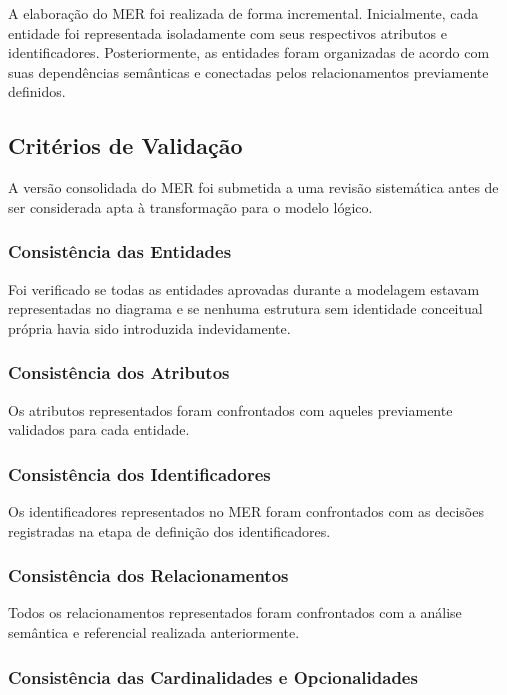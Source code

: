 \documentclass[12pt,a4paper]{article}
\begin{document}
	A elaboração do MER foi realizada de forma incremental. Inicialmente, cada
	entidade foi representada isoladamente com seus respectivos atributos e
	identificadores. Posteriormente, as entidades foram organizadas de acordo com
	suas dependências semânticas e conectadas pelos relacionamentos previamente
	definidos.
	
	\mbox{}\vspace{-\baselineskip}
	\subsection{Critérios de Validação}
	
	A versão consolidada do MER foi submetida a uma revisão sistemática antes de
	ser considerada apta à transformação para o modelo lógico.
	
	\subsubsection{Consistência das Entidades}
	
	Foi verificado se todas as entidades aprovadas durante a modelagem estavam
	representadas no diagrama e se nenhuma estrutura sem identidade conceitual
	própria havia sido introduzida indevidamente.
	
	\subsubsection{Consistência dos Atributos}
	
	Os atributos representados foram confrontados com aqueles previamente
	validados para cada entidade.
	
	\subsubsection{Consistência dos Identificadores}
	
	Os identificadores representados no MER foram confrontados com as decisões
	registradas na etapa de definição dos identificadores.
	
	\subsubsection{Consistência dos Relacionamentos}
	
	Todos os relacionamentos representados foram confrontados com a análise
	semântica e referencial realizada anteriormente.
	
	\subsubsection{Consistência das Cardinalidades e Opcionalidades}
	
\end{document}
